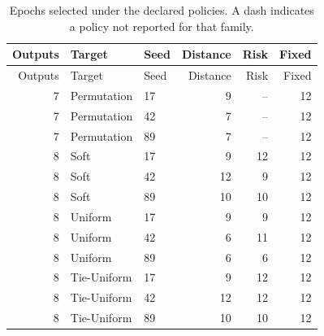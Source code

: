 \begingroup\small\setlength{\tabcolsep}{4pt}\setlength{\LTcapwidth}{\linewidth}
\begin{longtable}{rllrrr}
\caption{Epochs selected under the declared policies. A dash indicates a policy not reported for that family.}\label{tab:new-selected-epochs}\\
\toprule Outputs & Target & Seed & Distance & Risk & Fixed\\\midrule\endfirsthead
\toprule Outputs & Target & Seed & Distance & Risk & Fixed\\\midrule\endhead
7 & Permutation & 17 & 9 & -- & 12\\
7 & Permutation & 42 & 7 & -- & 12\\
7 & Permutation & 89 & 7 & -- & 12\\
8 & Soft & 17 & 9 & 12 & 12\\
8 & Soft & 42 & 12 & 9 & 12\\
8 & Soft & 89 & 10 & 10 & 12\\
8 & Uniform & 17 & 9 & 9 & 12\\
8 & Uniform & 42 & 6 & 11 & 12\\
8 & Uniform & 89 & 6 & 6 & 12\\
8 & Tie-Uniform & 17 & 9 & 12 & 12\\
8 & Tie-Uniform & 42 & 12 & 12 & 12\\
8 & Tie-Uniform & 89 & 10 & 10 & 12\\
\bottomrule\end{longtable}\endgroup

